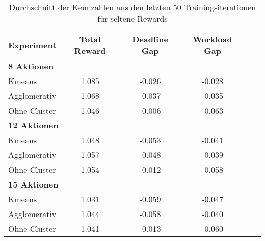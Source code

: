 \begin{table}[ht]
\centering
\begin{tabular}{lccccc}
\hline
\textbf{Experiment} & \textbf{Total Reward} & \textbf{Deadline Gap} & \textbf{Workload Gap} \\
\hline
\multicolumn{4}{l}{\textbf{8 Aktionen}} \\
\hspace{1em}Kmeans & 1.085 & -0.026 & -0.028 \\
\hspace{1em}Agglomerativ & 1.068 & -0.037 & -0.035 \\
\hspace{1em}Ohne Cluster & 1.046 & -0.006 & -0.063 \\
\hline
\multicolumn{4}{l}{\textbf{12 Aktionen}} \\
\hspace{1em}Kmeans & 1.048 & -0.053 & -0.041 \\
\hspace{1em}Agglomerativ & 1.057 & -0.048 & -0.039 \\
\hspace{1em}Ohne Cluster & 1.054 & -0.012 & -0.058 \\
\hline
\multicolumn{4}{l}{\textbf{15 Aktionen}} \\
\hspace{1em}Kmeans & 1.031 & -0.059 & -0.047 \\
\hspace{1em}Agglomerativ & 1.044 & -0.058 & -0.040 \\
\hspace{1em}Ohne Cluster & 1.041 & -0.013 & -0.060 \\
\hline
\end{tabular}
\caption{Durchschnitt der Kennzahlen aus den letzten 50 Trainingsiterationen für seltene Rewards}
\end{table}


